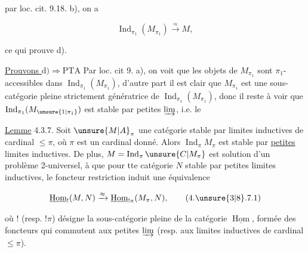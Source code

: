 
par loc. cit. 9.18. b), on a

\[
\operatorname{Ind}_{\pi_1}(M_{\pi_1})\xrightarrow{\approx}M,
\]

ce qui prouve d).

\uline{Prouvons $\mathrm{d})\Longrightarrow\mathrm{PTA}$} Par loc. cit 9. a),  on voit que les objets de $M_{\pi_1}$ sont $\pi_1$-accessibles dans $\operatorname{Ind}_{\pi_1}(M_{\pi_1})$,  d'autre part il est clair que $M_{\pi_1}$ est une sous-catégorie pleine strictement génératrice de  $\operatorname{Ind}_{\pi_1}(M_{\pi_1})$, donc il reste à voir que $\operatorname{Ind}_{\pi_1}(M_{\unsure{1|\pi_1}})$ est stable par petites $\varinjlim$, i.e. le

\uline{Lemme} 4.3.7. Soit $\unsure{M|A}_\pi$ une catégorie stable par limites inductives de cardinal $\leq\pi$, où $\pi$ est un cardinal  donné. Alors $\operatorname{Ind}_{\pi}M_{\pi}$ est stable par \uline{petites} limites inductives. De plus,  $M=\operatorname{Ind}_{\pi}\unsure{C|M_\pi}$ est solution d'un problème 2-universel, à  que   pour tte catégorie $N$ stable par petites limites inductives, le foncteur restriction  induit une équivalence

\[
\underline{\operatorname{Hom}}_{!}(M,N)\xrightarrow{\approx}
\underline{\operatorname{Hom}}_{!\pi}(M_{\pi},N),
\tag*{(4.\unsure{3|8}.7.1)}
\]

où    $!$ (resp. $!\pi$) désigne la sous-catégorie pleine de la catégorie $\underline{\operatorname{Hom}}$, formée des foncteurs qui commutent aux petites $\varinjlim$ (resp. aux limites inductives de cardinal $\leq\pi$).


